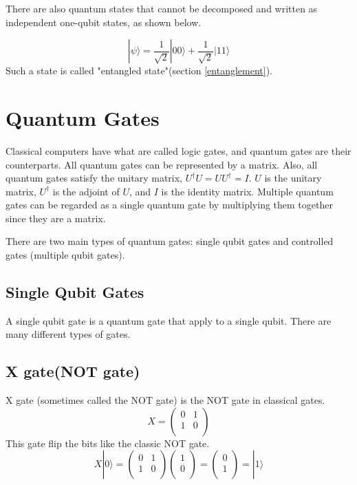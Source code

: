 There are also quantum states that cannot be decomposed and written as independent one-qubit states, as shown below. 

\begin{equation}
    |\psi\rangle = \frac{1}{\sqrt{2}} |00\rangle + \frac{1}{\sqrt{2}} |11\rangle
\end{equation}
Such a state is called "entangled state"(section \ref{entanglement}).

\section{Quantum Gates}
Classical computers have what are called logic gates, and quantum gates are their counterparts.
All quantum gates can be represented by a matrix.
Also, all quantum gates satisfy the unitary matrix, $U^\dagger U = UU^\dagger = I$.
$U$ is the unitary matrix, $U^\dagger$ is the adjoint of $U$, and $I$ is the identity matrix.
Multiple quantum gates can be regarded as a single quantum gate by multiplying them together since they are a matrix.

There are two main types of quantum gates: single qubit gates and controlled gates (multiple qubit gates).

\subsection{Single Qubit Gates}
A single qubit gate is a quantum gate that apply to a single qubit\cite{qgate}.
There are many different types of gates.
\subsection*{X gate(NOT gate)}
X gate (sometimes called the NOT gate) is the NOT gate in classical gates.
\begin{equation}
    X =
    \begin{pmatrix}
        0 & 1\\
        1 & 0\\
    \end{pmatrix}
\end{equation}
This gate flip the bits like the classic NOT gate.
\begin{equation}
    X |0\rangle =
    \begin{pmatrix}
        0 & 1\\
        1 & 0\\
    \end{pmatrix}
    \begin{pmatrix}
        1 \\
        0 \\
    \end{pmatrix} = 
    \begin{pmatrix}
        0 \\
        1 \\
    \end{pmatrix} = |1\rangle
\end{equation}

